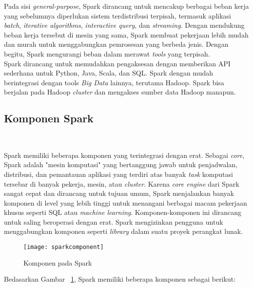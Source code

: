 Pada sisi \textit{general-purpose}, Spark dirancang untuk mencakup berbagai beban kerja yang sebelumnya diperlukan sistem terdistribusi terpisah, termasuk aplikasi \textit{batch}, \textit{iterative algorithms}, \textit{interactive query}, dan \textit{streaming}. Dengan mendukung beban kerja tersebut di mesin yang sama, Spark membuat pekerjaan lebih mudah dan murah untuk menggabungkan pemrosesan yang berbeda jenis. Dengan begitu, Spark mengurangi beban dalam merawat \textit{tools} yang terpisah.\\

Spark dirancang untuk memudahkan pengaksesan dengan memberikan API sederhana untuk Python, Java, Scala, dan SQL. Spark dengan mudah berintegrasi dengan tools \textit{Big Data} lainnya, terutama Hadoop. Spark bisa berjalan pada Hadoop \textit{cluster} dan mengakses sumber data Hadoop manapun.\\





\subsection{Komponen Spark}~\cite{holdenkarau:07:ls}

Spark memiliki beberapa komponen yang terintegrasi dengan erat. Sebagai \textit{core}, Spark adalah "mesin komputasi" yang bertanggung jawab untuk penjadwalan, distribusi, dan pemantauan aplikasi yang terdiri atas banyak \textit{task} komputasi tersebar di banyak pekerja, mesin, atau \textit{cluster}. Karena \textit{core engine} dari Spark sangat cepat dan dirancang untuk tujuan umum, Spark menjalankan banyak komponen di level yang lebih tinggi untuk menangani berbagai macam pekerjaan khusus seperti SQL atau \textit{machine learning}. Komponen-komponen ini dirancang untuk saling beroperasi dengan erat. Spark mengizinkan pengguna untuk menggabungkan komponen seperti \textit{library} dalam suatu proyek perangkat lunak.\\

\begin{figure}[H]
    \centering  
    \texttt{[image: sparkcomponent]}  
    \caption[Komponen pada Spark]{Komponen pada Spark} 
    \label{fig:sparkcomponent} 
\end{figure}

Bedasarkan Gambar ~\ref{fig:sparkcomponent}, Spark memiliki beberapa komponen sebagai berikut:

